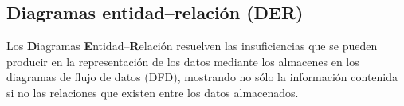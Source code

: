 \subsection{Diagramas entidad--relación (DER)} %
Los \textbf{D}iagramas \textbf{E}ntidad--\textbf{R}elación resuelven las insuficiencias que se pueden producir en la representación de los datos mediante los almacenes en los diagramas de flujo de datos (DFD), mostrando no sólo la información contenida si no las relaciones que existen entre los datos almacenados.



